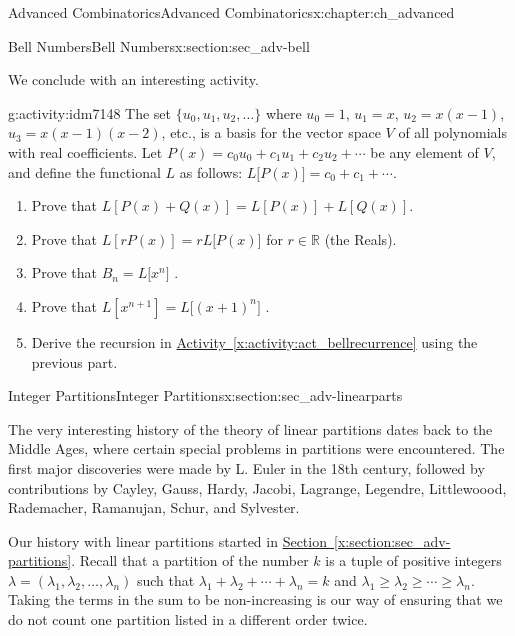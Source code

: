 \documentclass[oneside,10pt,]{book}
\numberwithin{equation}{chapter}
\def\R{\mathbb R}
\begin{document}
\begin{chapterptx}{Advanced Combinatorics}{}{Advanced Combinatorics}{}{}{x:chapter:ch_advanced}
\begin{sectionptx}{Bell Numbers}{}{Bell Numbers}{}{}{x:section:sec_adv-bell}
\par
We conclude with an interesting activity.%
\begin{activity}{}{g:activity:idm7148}%
The set \(\{u_{0}, u_{1}, u_{2}, \ldots \}\) where \(u_{0} = 1\), \(u_{1} = x\), \(u_{2} = x(x - 1)\), \(u_{3} = x(x - 1)(x - 2)\), etc., is a basis for the vector space \(V\) of all polynomials with real coefficients. Let \(P(x) = c_{0}u_{0} + c_{1}u_{1} + c_{2}u_{2} + \cdots\) be any element of \(V\), and define the functional \(L\) as follows: \(L\lbrack P(x)\rbrack = c_{0} + c_{1} + \cdots\).%
\par
%
\begin{enumerate}
\item{}Prove that \(L\left\lbrack P\left( x \right) + Q\left( x \right) \right\rbrack = L\left\lbrack P\left( x \right) \right\rbrack + L\left\lbrack Q\left( x \right) \right\rbrack.\)%
\item{}Prove that \(L\left\lbrack rP \left( x \right) \right\rbrack = rL\lbrack P\left( x \right)\rbrack\) for \(r \in \R\) (the Reals).%
\item{}Prove that \(B_{n} = L\lbrack x^{n}\rbrack\) .%
\item{}Prove that \(L\left\lbrack x^{n + 1} \right\rbrack = L\lbrack\left( x + 1 \right)^{n}\rbrack\) .%
\item{}Derive the recursion in \hyperref[x:activity:act_bellrecurrence]{Activity~\ref{x:activity:act_bellrecurrence}} using the previous part.%
\end{enumerate}
%
\end{activity}
\end{sectionptx}
%
%
\typeout{************************************************}
\typeout{************************************************}
%
\begin{sectionptx}{Integer Partitions}{}{Integer Partitions}{}{}{x:section:sec_adv-linearparts}
\begin{introduction}{}%
The very interesting history of the theory of linear partitions dates back to the Middle Ages, where certain special problems in partitions were encountered.  The first major discoveries were made by L. Euler in the 18th century, followed by contributions by Cayley, Gauss, Hardy, Jacobi, Lagrange, Legendre, Littlewoood, Rademacher, Ramanujan, Schur, and Sylvester.%
\par
Our history with linear partitions started in \hyperref[x:section:sec_adv-partitions]{Section~\ref{x:section:sec_adv-partitions}}.  Recall that a partition of the number \(k\) is a tuple of positive integers \(\lambda = (\lambda_1, \lambda_2, \ldots, \lambda_n)\) such that \(\lambda_1 + \lambda_2 + \cdots + \lambda_n = k\) and \(\lambda_1 \ge \lambda_2 \ge \cdots \ge \lambda_n\).  Taking the terms in the sum to be non-increasing is our way of ensuring that we do not count one partition listed in a different order twice.%

\end{introduction}
\end{sectionptx}
\end{chapterptx}
\end{document}
